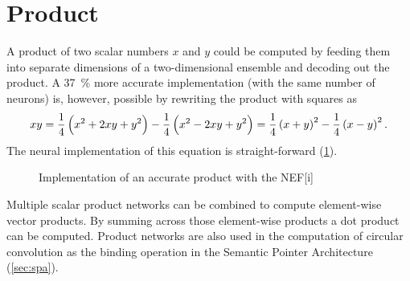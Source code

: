 \section{Product}\label{sec:product}
A product of two scalar numbers $x$ and $y$ could be computed by feeding them into separate dimensions of a two-dimensional ensemble and decoding out the product.
A \SI{37}{\percent} more accurate implementation (with the same number of neurons) is, however, possible \parencite{gosmann2015-1} by rewriting the product with squares as
\begin{equation}
    xy = \frac{1}{4}\del{x^2 + 2xy + y^2} - \frac{1}{4}\del{x^2 - 2xy + y^2} = \frac{1}{4}\del{x + y}^2 - \frac{1}{4}\del{x - y}^2 \text{.}
\end{equation}
The neural implementation of this equation is straight-forward (\cref{fig:product-net}).
\begin{figure}
    \begin{captionbeside}{Implementation of an accurate product with the NEF}[i]
    \end{captionbeside}\label{fig:product-net}
\end{figure}

Multiple scalar product networks can be combined to compute element-wise vector products.
By summing across those element-wise products a dot product can be computed.
Product networks are also used in the computation of circular convolution as the binding operation in the Semantic Pointer Architecture (\cref{sec:spa}).

